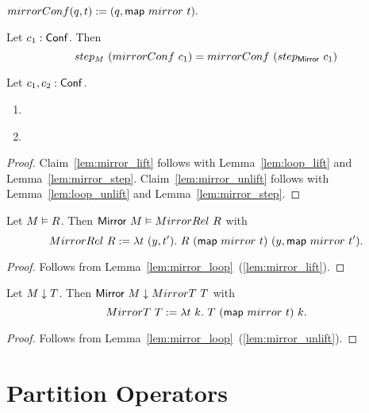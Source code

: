 \begin{definition}
  \label{def:mirrorConf}
  $mirrorConf(q,t) := (q, \mathsf{map}~mirror~t).$
\end{definition}


\begin{lemma}
  \label{lem:mirror_step}
  Let $c_1 : \mathsf{Conf}$.  Then
  \[ step_M~(mirrorConf~c_1) = mirrorConf~(step_{\mathsf{Mirror}}~c_1) \]
\end{lemma}

\begin{lemma}
  \label{lem:mirror_loop}
  Let $c_1, c_2 : \mathsf{Conf}$.
  \begin{enumerate}
  \item \label{lem:mirror_lift}
  \item \label{lem:mirror_unlift}
  \end{enumerate}
\end{lemma}
\begin{proof}
  Claim~\ref{lem:mirror_lift} follows with Lemma~\ref{lem:loop_lift} and Lemma~\ref{lem:mirror_step}.  Claim~\ref{lem:mirror_unlift} follows with
  Lemma~\ref{lem:loop_unlift} and Lemma~\ref{lem:mirror_step}.
\end{proof}

\begin{lemma}
  Let $M \mathrel{\vDash} R$.  Then $\mathsf{Mirror}~M \mathrel{\vDash} MirrorRel~R$ with
  \[
    MirrorRel~R := \lambda t~(y, t').~ R~(\mathsf{map}~mirror~t)~(y, \mathsf{map}~mirror~t').
  \]
\end{lemma}
\begin{proof}
  Follows from Lemma~\ref{lem:mirror_loop}~(\ref{lem:mirror_lift}).
\end{proof}
\begin{lemma}
  Let $M \mathrel{\downarrow} T$.  Then $\mathsf{Mirror}~M \mathrel{\downarrow} MirrorT~T$ with
  \[
    MirrorT~T := \lambda t~k.~ T~(\mathsf{map}~mirror~t)~k.
  \]
\end{lemma}
\begin{proof}
  Follows from Lemma~\ref{lem:mirror_loop}~(\ref{lem:mirror_unlift}).
\end{proof}

\section{Partition Operators}
\label{sec:partition-op}
%

